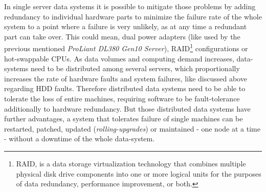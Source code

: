 In single server data systems it is possible to mitigate those problems by adding redundancy to individual hardware parts to minimize the failure rate of the whole system to a point where a failure is very unlikely, as at any time a redundant part can take over. This could mean, dual power adapters (like used by the previous mentioned \textit{ProLiant DL380 Gen10 Server}), RAID\footnote{RAID, is a data storage virtualization technology that combines multiple physical disk drive components into one or more logical units for the purposes of data redundancy, performance improvement, or both.} configurations or hot-swappable CPUs.
As data volumes and computing demand increases, data-systems need to be distributed among several servers, which proportionally increases the rate of hardware faults and system failures, like discussed above regarding HDD faults. Therefore distributed data systems need to be able to tolerate the loss of entire machines, requiring software to be fault-tolerance additionally to hardware redundancy. 
But those distributed data systems have further advantages, a system that tolerates failure of single machines can be restarted, patched, updated (\textit{rolling-upgrades}) or maintained - one node at a time - without a downtime of the whole data-system.

